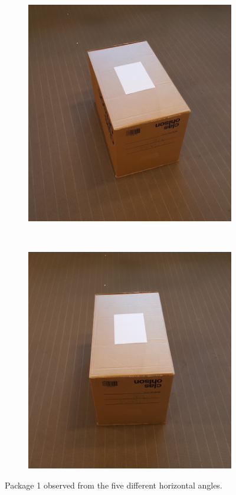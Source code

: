 \begin{figure}
	\begin{subfigure}[b]{0.2\textwidth}
		\includegraphics[width=\textwidth]{figures/angle_4.jpg}
		\label{fig:angle_4}
	\end{subfigure}
	~
	\begin{subfigure}[b]{0.2\textwidth}
		\includegraphics[width=\textwidth]{figures/angle_5.jpg}
		\label{fig:angle_5}
	\end{subfigure}
	\caption{Package 1 observed from the five different horizontal angles.}\label{fig:positions}
\end{figure}


